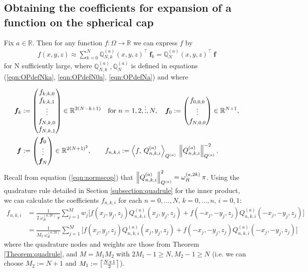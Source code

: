 \documentclass[11pt, oneside]{article}   	%
\newcommand{\R}{\mathbb{R}}
\newcommand{\genjac}{R}
\newcommand{\normgenjac}{\omega_\genjac}
\newcommand{\scop}{Q}
\newcommand{\scopnki}{\scop_{n,k,i}}
\newcommand{\scopa}{\scop^{(a)}}
\newcommand{\scopnkia}{\scopnki^{(a)}}
\newcommand{\bigscop}{{\mathbb{Q}}}
\newcommand{\bigscopa}{\bigscop^{(a)}}
\newcommand{\bigscopNa}{\bigscopa_{N}}
\newcommand{\bigscopNka}{\bigscopa_{N,k}}
\begin{document}
\subsection{Obtaining the coefficients for expansion of a function on the spherical cap}\label{subsection:expandingfunctions}

Fix $a \in \R$. Then for any function $f : \Omega \to \R$ we can express $f$ by
\begin{align*}
	f(x,y,z) \approx \sum_{k=0}^N \bigscopNka(x,y,z)^\top \: \bm{f}_k = \bigscopNa(x,y,z)^\top \: \bm{f}
\end{align*}
for N sufficiently large, where $\bigscopNka, \bigscopNa$ is defined in equations (\ref{eqn:OPdefNka}, \ref{eqn:OPdefN0a}, \ref{eqn:OPdefNa}) and where

\begin{align*}
	\bm{f}_k &:= 
		\begin{pmatrix}
			f_{k,k,0} \\
			f_{k,k,1} \\
			\vdots \\
			f_{N,k,0} \\
			f_{N,k,1}
		\end{pmatrix} \in \R^{2(N-k+1)} \quad \text{for } n = 1,2,\dots,N, \quad
	\bm{f}_0 := 
		\begin{pmatrix}
			f_{0,0,0} \\
			\vdots \\
			f_{N,0,0}
		\end{pmatrix} \in \R^{N+1}, \\
	\bm{f} &:= 
		\begin{pmatrix}
			\bm{f}_0 \\
			\vdots \\
			\bm{f}_N
		\end{pmatrix} \in \R^{2(N+1)^2}, \quad \quad
	f_{n,k,i} := \ip< f, \: \scopnkia>_{\scopa} \: \norm{\scopnkia}^{-2}_{\scopa}.
\end{align*}
Recall from equation (\ref{eqn:normscop}) that $\norm{\scopnkia}^2_{\scopa} = \normgenjac^{(a,2k)} \: \pi$. Using the quadrature rule detailed in Section \ref{subsection:quadrule} for the inner product, we can calculate the coefficients $f_{n,k,i}$ for each $n = 0,\dots,N$, $k = 0,\dots,n$, $i = 0,1$: 
\begin{align*}
	f_{n,k,i} &= \frac{1}{2 \: \normgenjac^{(a,2k)} \: \pi} \sum_{j=1}^{M} w_j \big[ f(x_j, y_j, z_j) \scopnkia(x_j, y_j, z_j) +f(-x_j, -y_j, z_j) \scopnkia(-x_j, -y_j, z_j) \big] \\
	&= \frac{1}{M_2 \: \normgenjac^{(a,2k)}} \sum_{j=1}^{M} \big[ f(x_j, y_j, z_j) \scopnkia(x_j, y_j, z_j) +f(-x_j, -y_j, z_j) \scopnkia(-x_j, -y_j, z_j) \big]
\end{align*}
where the quadrature nodes and weights are those from Theorem \ref{Theorem:quadrule}, and $M = M_1 M_2$ with $2M_1 - 1 \ge N, M_2 - 1 \ge N$ (i.e. we can choose $M_2 := N + 1$ and $M_1 := \left\lceil\frac{N+1}{2}\right\rceil$).
\end{document}
